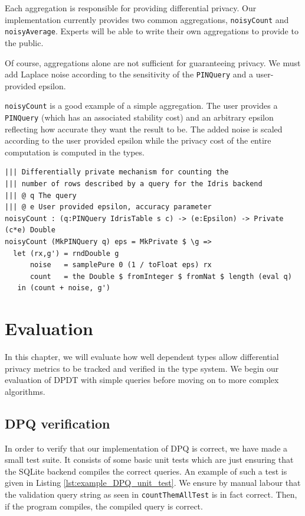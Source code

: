 \documentclass[12pt]{report}
\begin{document}
Each aggregation is responsible for providing differential privacy.
Our implementation currently provides two common aggregations, \texttt{noisyCount} and \texttt{noisyAverage}.
Experts will be able to write their own aggregations to provide to the public.

Of course, aggregations alone are not sufficient for guaranteeing privacy.
We must add Laplace noise according to the sensitivity of the \texttt{PINQuery} and a user-provided epsilon.

\texttt{noisyCount} is a good example of a simple aggregation.
The user provides a \texttt{PINQuery} (which has an associated stability cost) and an arbitrary epsilon reflecting how accurate they want the result to be.
The added noise is scaled according to the user provided epsilon while the privacy cost of the entire computation is computed in the types.

\begin{lstlisting}[caption={Representing aggregations},label={lst:aggregations}]
||| Differentially private mechanism for counting the
||| number of rows described by a query for the Idris backend
||| @ q The query
||| @ e User provided epsilon, accuracy parameter
noisyCount : (q:PINQuery IdrisTable s c) -> (e:Epsilon) -> Private (c*e) Double
noisyCount (MkPINQuery q) eps = MkPrivate $ \g =>
  let (rx,g') = rndDouble g
      noise   = samplePure 0 (1 / toFloat eps) rx
      count   = the Double $ fromInteger $ fromNat $ length (eval q)
   in (count + noise, g')
\end{lstlisting}

\chapter{Evaluation}\label{sec:evaluation}

In this chapter, we will evaluate how well dependent types allow differential privacy metrics to be tracked and verified in the type system.
We begin our evaluation of DPDT with simple queries before moving on to more complex algorithms.

\section{DPQ verification}

In order to verify that our implementation of DPQ is correct, we have made a small test suite.
It consists of some basic unit tests which are just ensuring that the SQLite backend compiles the correct queries.
An example of such a test is given in Listing \ref{lst:example_DPQ_unit_test}.
We ensure by manual labour that the validation query string as seen in \texttt{countThemAllTest} is in fact correct.
Then, if the program compiles, the compiled query is correct.
\end{document}
